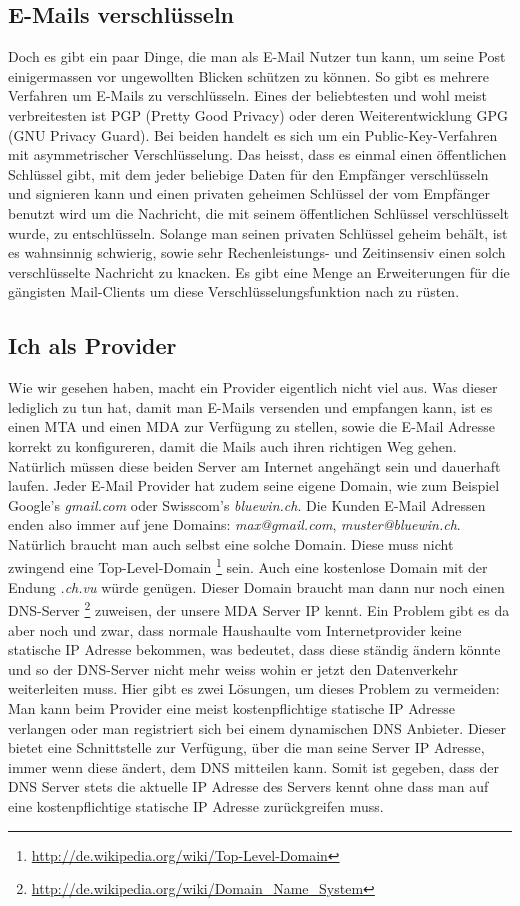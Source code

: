 \subsection{E-Mails verschlüsseln}
Doch es gibt ein paar Dinge, die man als E-Mail Nutzer tun kann, um seine Post einigermassen vor ungewollten Blicken schützen zu können.
So gibt es mehrere Verfahren um E-Mails zu verschlüsseln. Eines der beliebtesten und wohl meist verbreitesten ist PGP (Pretty Good Privacy) oder deren Weiterentwicklung GPG (GNU Privacy Guard).
Bei beiden handelt es sich um ein Public-Key-Verfahren mit asymmetrischer Verschlüsselung. Das heisst, dass es einmal einen öffentlichen Schlüssel gibt, mit dem jeder beliebige Daten für den Empfänger verschlüsseln und signieren kann und einen privaten geheimen Schlüssel der vom Empfänger benutzt wird um die Nachricht, die mit seinem öffentlichen Schlüssel verschlüsselt wurde, zu entschlüsseln.
Solange man seinen privaten Schlüssel geheim behält, ist es wahnsinnig schwierig, sowie sehr Rechenleistungs- und Zeitinsensiv einen solch verschlüsselte Nachricht zu knacken.
Es gibt eine Menge an Erweiterungen für die gängisten Mail-Clients um diese Verschlüsselungsfunktion nach zu rüsten.
\subsection{Ich als Provider}
Wie wir gesehen haben, macht ein Provider eigentlich nicht viel aus. Was dieser lediglich zu tun hat, damit man E-Mails versenden und empfangen kann, ist es einen MTA und einen MDA zur Verfügung zu stellen, sowie die E-Mail Adresse korrekt zu konfigureren, damit die Mails auch ihren richtigen Weg gehen. Natürlich müssen diese beiden Server am Internet angehängt sein und dauerhaft laufen.
Jeder E-Mail Provider hat zudem seine eigene Domain, wie zum Beispiel Google's \textit{gmail.com} oder Swisscom's \textit{bluewin.ch}. Die Kunden E-Mail Adressen enden also immer auf jene Domains: \textit{max@gmail.com}, \textit{muster@bluewin.ch}. Natürlich braucht man auch selbst eine solche Domain. Diese muss nicht zwingend eine Top-Level-Domain \footnote{\url{http://de.wikipedia.org/wiki/Top-Level-Domain}} sein. Auch eine kostenlose Domain mit der Endung \textit{.ch.vu} würde genügen. Dieser Domain braucht man dann nur noch einen DNS-Server \footnote{\url{http://de.wikipedia.org/wiki/Domain\_Name\_System}} zuweisen, der unsere MDA Server IP kennt. Ein Problem gibt es da aber noch und zwar, dass normale Haushaulte vom Internetprovider keine statische IP Adresse bekommen, was bedeutet, dass diese ständig ändern könnte und so der DNS-Server nicht mehr weiss wohin er jetzt den Datenverkehr weiterleiten muss. Hier gibt es zwei Lösungen, um dieses Problem zu vermeiden: Man kann beim Provider eine meist kostenpflichtige statische IP Adresse verlangen oder man registriert sich bei einem dynamischen DNS Anbieter. Dieser bietet eine Schnittstelle zur Verfügung, über die man seine Server IP Adresse, immer wenn diese ändert, dem DNS mitteilen kann. Somit ist gegeben, dass der DNS Server stets die aktuelle IP Adresse des Servers kennt ohne dass man auf eine kostenpflichtige statische IP Adresse zurückgreifen muss.

